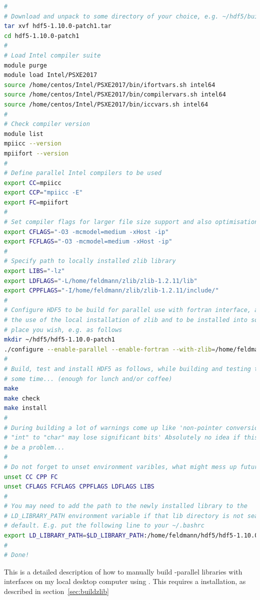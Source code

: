 \documentclass[a4paper, 11pt, DIV=11]{scrartcl}
\begin{document}
\begin{lstlisting}[language=bash]
# 
# Download and unpack to some directory of your choice, e.g. ~/hdf5/build/.
tar xvf hdf5-1.10.0-patch1.tar 
cd hdf5-1.10.0-patch1
#
# Load Intel compiler suite
module purge
module load Intel/PSXE2017
source /home/centos/Intel/PSXE2017/bin/ifortvars.sh intel64
source /home/centos/Intel/PSXE2017/bin/compilervars.sh intel64
source /home/centos/Intel/PSXE2017/bin/iccvars.sh intel64
#
# Check compiler version
module list
mpiicc --version
mpiifort --version
#
# Define parallel Intel compilers to be used
export CC=mpiicc
export CCP="mpiicc -E"
export FC=mpiifort
#
# Set compiler flags for larger file size support and also optimisation level 3
export CFLAGS="-O3 -mcmodel=medium -xHost -ip"
export FCFLAGS="-O3 -mcmodel=medium -xHost -ip"
#
# Specify path to locally installed zlib library
export LIBS="-lz"
export LDFLAGS="-L/home/feldmann/zlib/zlib-1.2.11/lib"
export CPPFLAGS="-I/home/feldmann/zlib/zlib-1.2.11/include/"
#
# Configure HDF5 to be build for parallel use with fortran interface, as well as
# the use of the local installation of zlib and to be installed into some
# place you wish, e.g. as follows
mkdir ~/hdf5/hdf5-1.10.0-patch1
./configure --enable-parallel --enable-fortran --with-zlib=/home/feldmann/zlib/zlib-1.2.11 --prefix=/home/feldmann/hdf5/hdf5-1.10.0-patch1
#
# Build, test and install HDF5 as follows, while building and testing take quite
# some time... (enough for lunch and/or coffee)
make
make check
make install
#
# During building a lot of warnings come up like 'non-pointer conversion from
# "int" to "char" may lose significant bits' Absolutely no idea if this might
# be a problem...
# 
# Do not forget to unset environment varibles, what might mess up future builds
unset CC CPP FC
unset CFLAGS FCFLAGS CPPFLAGS LDFLAGS LIBS
#
# You may need to add the path to the newly installed library to the
# LD_LIBRARY_PATH environment variable if that lib directory is not searched by
# default. E.g. put the following line to your ~/.bashrc
export LD_LIBRARY_PATH=$LD_LIBRARY_PATH:/home/feldmann/hdf5/hdf5-1.10.0-patch1/lib
# 
# Done!
\end{lstlisting}

This is a detailed description of how to manually build \mpi-parallel \hdf
libraries with \fortran interfaces on my local desktop computer using
. This requires a  installation, as described in
section~\ref{sec:buildzlib}
\end{document}
